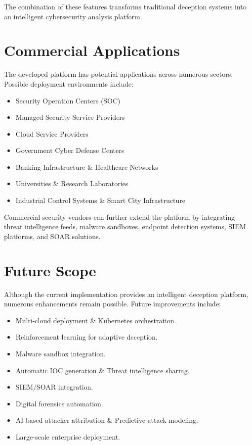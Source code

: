 \documentclass[12pt,a4paper]{report}
\begin{document}
The combination of these features transforms traditional deception systems into an intelligent cybersecurity analysis platform.


\section{Commercial Applications}

The developed platform has potential applications across numerous sectors. Possible deployment environments include:

\begin{itemize}
\item Security Operation Centers (SOC)
\item Managed Security Service Providers
\item Cloud Service Providers
\item Government Cyber Defense Centers
\item Banking Infrastructure \& Healthcare Networks
\item Universities \& Research Laboratories
\item Industrial Control Systems \& Smart City Infrastructure
\end{itemize}

Commercial security vendors can further extend the platform by integrating threat intelligence feeds, malware sandboxes, endpoint detection systems, SIEM platforms, and SOAR solutions.


\section{Future Scope}

Although the current implementation provides an intelligent deception platform, numerous enhancements remain possible. Future improvements include:

\begin{itemize}
\item Multi-cloud deployment \& Kubernetes orchestration.
\item Reinforcement learning for adaptive deception.
\item Malware sandbox integration.
\item Automatic IOC generation \& Threat intelligence sharing.
\item SIEM/SOAR integration.
\item Digital forensics automation.
\item AI-based attacker attribution \& Predictive attack modeling.
\item Large-scale enterprise deployment.
\end{itemize}
\end{document}
